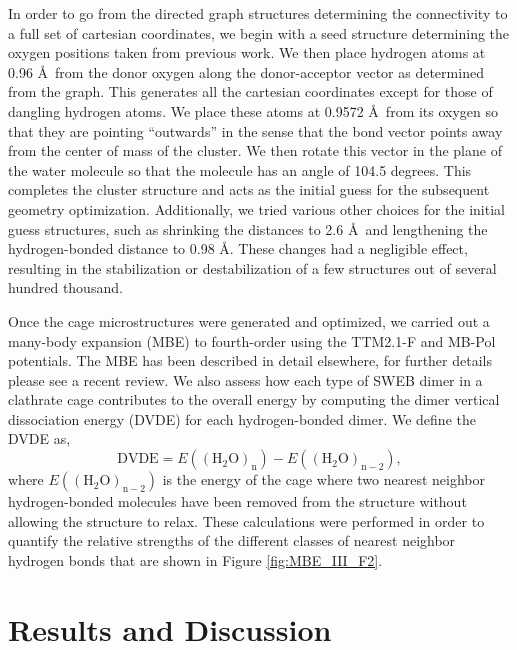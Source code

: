 \documentclass[11pt, proquest]{uwthesis}[2020/02/24]
\let\ce\ch
\begin{document}
\par In order to go from the directed graph structures determining the connectivity to a full set of cartesian coordinates, we begin with a seed structure determining the oxygen positions taken from previous work.\autocite{xantheas_lowlying_2012} We then place hydrogen atoms at 0.96 \AA ~from the donor oxygen along the donor-acceptor vector as determined from the graph. This generates all the cartesian coordinates except for those of dangling hydrogen atoms. We place these atoms at 0.9572 \AA ~from its oxygen so that they are pointing “outwards” in the sense that the \ce{O-H} bond vector points away from the center of mass of the cluster. We then rotate this vector in the plane of the water molecule so that the molecule has an \ce{HOH} angle of 104.5 degrees. This completes the cluster structure and acts as the initial guess for the subsequent geometry optimization. Additionally, we tried various other choices for the initial guess structures, such as shrinking the \ce{O-O} distances to 2.6 \AA ~and lengthening the hydrogen-bonded \ce{O-H} distance to 0.98 \AA. These changes had a negligible effect, resulting in the stabilization or destabilization of a few structures out of several hundred thousand.

\par Once the cage microstructures were generated and optimized, we carried out a many-body expansion (MBE) to fourth-order using the TTM2.1-F and MB-Pol potentials. The MBE has been described in detail elsewhere, for further details please see a recent review.\autocite{herbert_fantasy_2019} We also assess how each type of SWEB dimer in a clathrate cage contributes to the overall energy by computing the dimer vertical dissociation energy (DVDE) for each hydrogen-bonded dimer. We define the DVDE as,
\begin{equation}
    \mathrm{DVDE}=E\left(\mathrm{(H_2O)_n}\right)-E\left(\mathrm{(H_2O)_{n-2}}\right),
\end{equation}
where $E\left(\mathrm{(H_2O)_{n-2}}\right)$ is the energy of the cage where two nearest neighbor hydrogen-bonded molecules have been removed from the structure without allowing the structure to relax. These calculations were performed in order to quantify the relative strengths of the different classes of nearest neighbor hydrogen bonds that are shown in Figure \ref{fig:MBE_III_F2}.

\section{Results and Discussion}
\end{document}
